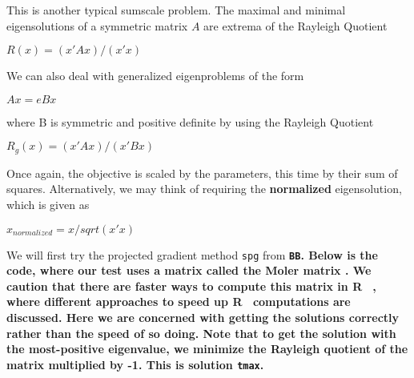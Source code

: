 \documentclass[11pt]{article}\usepackage[]{graphicx}\usepackage[]{color}
\newcommand{\B}[1]{{\bf #1 \rm}}
\newcommand{\R}{{\sf R }}
\newcommand{\code}[1]{{\tt#1}}
\newcommand{\pkg}[1]{\bf{\tt#1}\rm }
\begin{document}
This is another typical sumscale problem. 
The maximal and minimal eigensolutions of a symmetric matrix $A$ 
are extrema of the Rayleigh Quotient

$ R(x) =  (x' A x)  / (x' x) $

We can also deal with generalized eigenproblems of the form 

$A x = e B x$

where B is symmetric and positive definite by using the Rayleigh Quotient

$ R_g(x) =  (x' A x)  / (x' B x) $

Once again, the objective is scaled by the parameters, this time by their 
sum of squares. Alternatively, 
we may think of requiring the \B{normalized} eigensolution, which is given as 

$ x_{normalized} = x/sqrt(x' x) $

We will first try the projected gradient method \code{spg} from \pkg{BB}. 
Below is the code, where our test uses
a matrix called the Moler matrix \cite[Appendix 1]{cnm79}. We caution that there
are faster ways to compute this matrix in \R\, \citep{RQtimes12}, where different
approaches to speed up \R\ computations are discussed. Here we are concerned 
with getting the solutions correctly rather than the speed of so doing. Note
that to get the solution with the most-positive eigenvalue, we minimize the
Rayleigh quotient of the matrix multiplied by -1. This is solution \code{tmax}.
\end{document}
